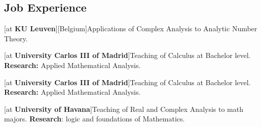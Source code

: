 \documentclass[a4paper]{arthur-cv}
\begin{document}
\begin{textblock}{20.5}
\begin{minipage}[t]{0.37\textwidth}
  \end{minipage}\hfill\begin{minipage}[t]{0.61\textwidth}

  
    \section{Job Experience}
      \begin{rightenv}
        [at \textbf{KU Leuven}][Belgium]{Applications of Complex Analysis to Analytic Number Theory.}
        
        [at \textbf{University Carlos III of Madrid}]{Teaching of Calculus at Bachelor level. \textbf{Research:} Applied Mathematical Analysis.}

        [at \textbf{University Carlos III of Madrid}]{Teaching of Calculus at Bachelor level. \textbf{Research:} Applied Mathematical Analysis.}
        
        [at \textbf{University of Havana}]{Teaching of Real and Complex Analysis to math majors. \textbf{Research}: logic and foundations of Mathematics.}

      \end{rightenv}




\end{minipage}
\end{textblock}
\end{document}
